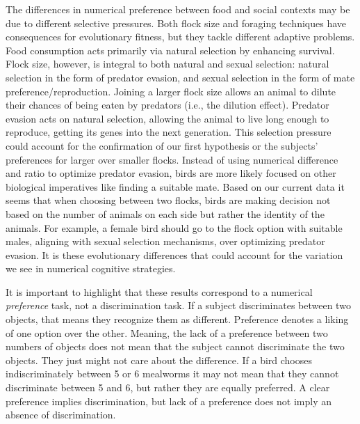 \documentclass[
  english,
  ,doc,floatsintext]{apa6}
\begin{document}
The differences in numerical preference between food and social contexts may be due to different selective pressures. Both flock size and foraging techniques have consequences for evolutionary fitness, but they tackle different adaptive problems. Food consumption acts primarily via natural selection by enhancing survival. Flock size, however, is integral to both natural and sexual selection: natural selection in the form of predator evasion, and sexual selection in the form of mate preference/reproduction. Joining a larger flock size allows an animal to dilute their chances of being eaten by predators (i.e., the dilution effect). Predator evasion acts on natural selection, allowing the animal to live long enough to reproduce, getting its genes into the next generation. This selection pressure could account for the confirmation of our first hypothesis or the subjects' preferences for larger over smaller flocks. Instead of using numerical difference and ratio to optimize predator evasion, birds are more likely focused on other biological imperatives like finding a suitable mate. Based on our current data it seems that when choosing between two flocks, birds are making decision not based on the number of animals on each side but rather the identity of the animals. For example, a female bird should go to the flock option with suitable males, aligning with sexual selection mechanisms, over optimizing predator evasion. It is these evolutionary differences that could account for the variation we see in numerical cognitive strategies.

It is important to highlight that these results correspond to a numerical \emph{preference} task, not a discrimination task. If a subject discriminates between two objects, that means they recognize them as different. Preference denotes a liking of one option over the other. Meaning, the lack of a preference between two numbers of objects does not mean that the subject cannot discriminate the two objects. They just might not care about the difference. If a bird chooses indiscriminately between 5 or 6 mealworms it may not mean that they cannot discriminate between 5 and 6, but rather they are equally preferred. A clear preference implies discrimination, but lack of a preference does not imply an absence of discrimination.
\end{document}
